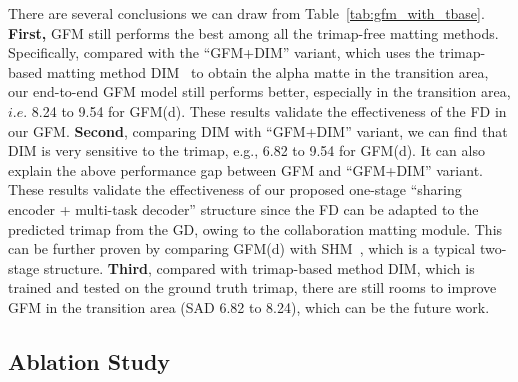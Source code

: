 \documentclass[twocolumn]{svjour3}
\begin{document}
There are several conclusions we can draw from Table~\ref{tab:gfm_with_tbase}. \textbf{First,} GFM still performs the best among all the trimap-free matting methods. Specifically, compared with the ``GFM+DIM'' variant, which uses the trimap-based matting method DIM~\citep{xu2017deep} to obtain the alpha matte in the transition area, our end-to-end GFM model still performs better, especially in the transition area, $i.e.$ 8.24 to 9.54 for GFM(d). These results validate the effectiveness of the FD in our GFM. \textbf{Second}, comparing DIM with ``GFM+DIM'' variant, we can find that DIM is very sensitive to the trimap, e.g., 6.82 to 9.54 for GFM(d). It can also explain the above performance gap between GFM and ``GFM+DIM'' variant. These results validate the effectiveness of our proposed one-stage ``sharing encoder + multi-task decoder'' structure since the FD can be adapted to the predicted trimap from the GD, owing to the collaboration matting module. This can be further proven by comparing GFM(d) with SHM~\citep{chen2018semantic}, which is a typical two-stage structure. \textbf{Third}, compared with trimap-based method DIM, which is trained and tested on the ground truth trimap, there are still rooms to improve GFM in the transition area (SAD 6.82 to 8.24), which can be the future work.


\subsection{Ablation Study}
\end{document}

